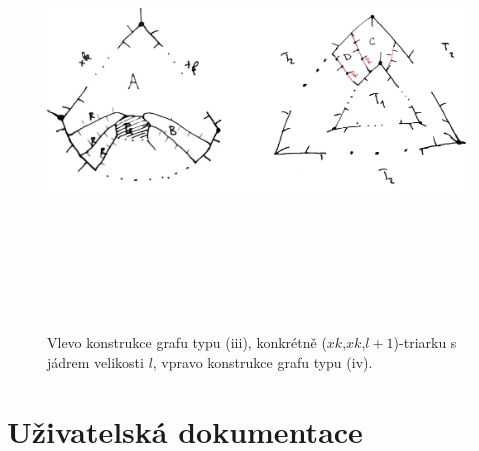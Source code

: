 \begin{figure}[h!]\centering
\includegraphics[height=120mm]{../img/iii+iv-construction}
\caption{Vlevo konstrukce grafu typu (iii), konkrétně ($xk$,$xk$,$l+1$)-triarku s jádrem velikosti $l$, vpravo konstrukce grafu typu (iv).}
\label{obr03:konstrukce}

\end{figure}

\section{Uživatelská dokumentace}


